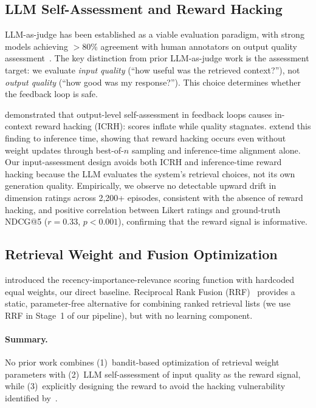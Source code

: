 \subsection{LLM Self-Assessment and Reward Hacking}

LLM-as-judge has been established as a viable evaluation paradigm, with strong models achieving $>$80\% agreement with human annotators on output quality assessment~\citep{zheng2023judging}.
The key distinction from prior LLM-as-judge work is the assessment target: we evaluate \emph{input quality} (``how useful was the retrieved context?''), not \emph{output quality} (``how good was my response?'').
This choice determines whether the feedback loop is safe.

\citet{pan2024feedback} demonstrated that output-level self-assessment in feedback loops causes in-context reward hacking (ICRH): scores inflate while quality stagnates.
\citet{khalaf2025itrh} extend this finding to inference time, showing that reward hacking occurs even without weight updates through best-of-$n$ sampling and inference-time alignment alone.
Our input-assessment design avoids both ICRH and inference-time reward hacking because the LLM evaluates the system's retrieval choices, not its own generation quality.
Empirically, we observe no detectable upward drift in dimension ratings across 2{,}200+ episodes, consistent with the absence of reward hacking, and positive correlation between Likert ratings and ground-truth NDCG@5 ($r{=}0.33$, $p{<}0.001$), confirming that the reward signal is informative.

\subsection{Retrieval Weight and Fusion Optimization}

\citet{park2023generative} introduced the recency-importance-relevance scoring function with hardcoded equal weights, our direct baseline.
Reciprocal Rank Fusion (RRF)~\citep{cormack2009reciprocal} provides a static, parameter-free alternative for combining ranked retrieval lists (we use RRF in Stage~1 of our pipeline), but with no learning component.

\paragraph{Summary.}
No prior work combines (1)~bandit-based optimization of retrieval weight parameters with (2)~LLM self-assessment of input quality as the reward signal, while (3)~explicitly designing the reward to avoid the hacking vulnerability identified by~\citet{pan2024feedback}.
